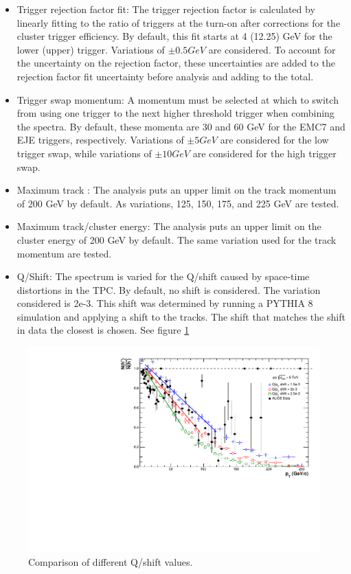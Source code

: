 \begin{itemize}
    \item Trigger rejection factor fit: The trigger rejection factor is calculated by linearly fitting to the ratio of triggers at the turn-on after corrections for the cluster trigger efficiency. By default, this fit starts at 4 (12.25) GeV for the lower (upper) trigger. Variations of $\pm 0.5 GeV$ are considered. To account for the uncertainty on the rejection factor, these uncertainties are added to the rejection factor fit uncertainty before analysis and adding to the total.
    
    \item Trigger swap momentum: A momentum must be selected at which to switch from using one trigger to the next higher threshold trigger when combining the spectra. By default, these momenta are 30 and 60 GeV for the EMC7 and EJE triggers, respectively. Variations of $\pm 5 GeV$ are considered for the low trigger swap, while variations of $\pm 10 GeV$ are considered for the high trigger swap.
    
    \item Maximum track \pT: The analysis puts an upper limit on the track momentum of 200 GeV by default. As variations, 125, 150, 175, and 225 GeV are tested.
    
    \item Maximum track/cluster energy: The analysis puts an upper limit on the cluster energy of 200 GeV by default. The same variation used for the track momentum are tested.
    
    \item Q/\pT Shift: The spectrum is varied for the Q/\pT shift caused by space-time distortions in the TPC. By default, no shift is considered. The variation considered is 2e-3. This shift was determined by running a PYTHIA 8 simulation and applying a shift to the tracks. The shift that matches the shift in data the closest is chosen. See figure \ref{fig:QoverPtShift}
\end{itemize}

\begin{figure}
    \centering
    \includegraphics[width=15cm]{figures/QoverPtShift/QPTComparison.pdf}
    \caption{Comparison of different Q/\pT shift values.}
    \label{fig:QoverPtShift}
\end{figure}

